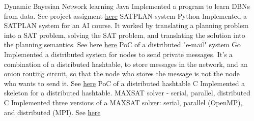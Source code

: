 \documentclass[]{colobas-cv}
\begin{document}
\entry
  {}
  {Dynamic Bayesian Network learning}
  {Java}
  {Implemented a program to learn DBNs from data. See project assigment 
  \href{https://fenix.tecnico.ulisboa.pt/downloadFile/1689468335554723/apresentacao-projecto-POO1415.pdf}{here}}
\entry
  {}
  {SATPLAN system}
  {Python}
  {Implemented a SATPLAN system for an AI course. It worked by translating a
  planning problem into a SAT problem, solving the SAT problem, and translating
  the solution into the planning semantics. See here \href{https://github.com/colobas/ia-proj2}{here}}
\entry
  {}
  {PoC of a distributed "e-mail" system}
  {Go}
  {Implemented a distributed system for nodes to send private messages. It's a
  combination of a distributed hashtable, to store messages in the network, and
  an onion routing circuit, so that the node who stores the message is not the
  node who wants to send it. See \href{https://github.com/colobas/distributed-email}{here}}
\entry
  {}
  {PoC of a distributed hashtable}
  {C}
  {Implemented a skeleton for a distributed hashtable.}
\entry
  {}
  {MAXSAT solver - serial, parallel, distributed}
  {C}
  {Implemented three versions of a MAXSAT solver: serial, parallel (OpenMP), and
  distributed (MPI). See \href{https://github.com/colobas/maxsat-solver}{here}}
\end{document}
